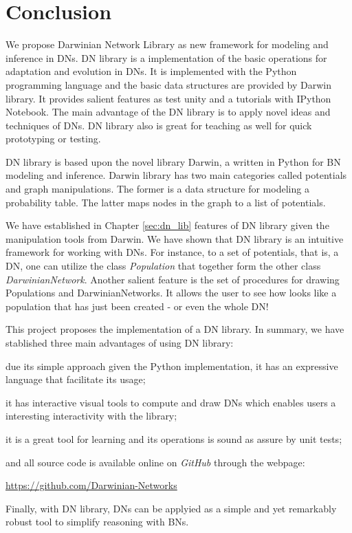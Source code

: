 \chapter{Conclusion}
\label{sec:conclusion}

We propose Darwinian Network Library as new framework for modeling and inference in DNs.
DN library is a implementation of the basic operations for adaptation and evolution in DNs.
It is implemented with the Python programming language and the basic data structures are provided by Darwin library.
It provides salient features as test unity and a tutorials with IPython Notebook.
The main advantage of the DN library is to apply novel ideas and techniques of DNs.
DN library also is great for teaching as well for quick prototyping or testing.


DN library is based upon the novel library Darwin, a written in Python for BN modeling and inference.
Darwin library has two main categories called potentials and graph manipulations.
The former is a data structure for modeling a probability table.
The latter maps nodes in the graph to a list of potentials.


We have established in Chapter \ref{sec:dn_lib} features of DN library given the manipulation tools from Darwin.
We have shown that DN library is an intuitive framework for working with DNs.
For instance, to a set of potentials, that is, a DN, one can utilize the class \emph{Population} that together form the other class \emph{DarwinianNetwork}.
Another salient feature is the set of procedures for drawing Populations and DarwinianNetworks.
It allows the user to see how looks like a population that has just been created - or even the whole DN!


This project proposes the implementation of a DN library.
In summary, we have stablished three main advantages of using DN library:
\begin{inparaenum}[(i)]
\item due its simple approach given the Python implementation, it has an expressive language that facilitate its usage;
\item it has interactive visual tools to compute and draw DNs which enables users a interesting interactivity with the library;
\item it is a great tool for learning and its operations is sound as assure by unit tests;
\item and all source code is available online on \emph{GitHub} through the webpage:
\end{inparaenum}
\begin{center}
\url{https://github.com/Darwinian-Networks}
\end{center}
Finally, with DN library, DNs can be applyied as a simple and yet remarkably robust tool to simplify reasoning with BNs.
